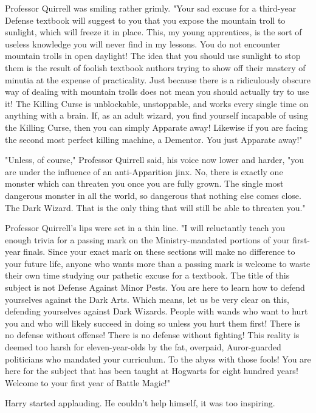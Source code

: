 Professor Quirrell was smiling rather grimly. "Your sad excuse for a third-year
Defense textbook will suggest to you that you expose the mountain troll to
sunlight, which will freeze it in place. This, my young apprentices, is the
sort of useless knowledge you will never find in my lessons. You do not
encounter mountain trolls in open daylight! The idea that you should use
sunlight to stop them is the result of foolish textbook authors trying to show
off their mastery of minutia at the expense of practicality. Just because there
is a ridiculously obscure way of dealing with mountain trolls does not mean you
should actually try to use it! The Killing Curse is unblockable, unstoppable,
and works every single time on anything with a brain. If, as an adult wizard,
you find yourself incapable of using the Killing Curse, then you can simply
Apparate away! Likewise if you are facing the second most perfect killing
machine, a Dementor. You just Apparate away!"

"Unless, of course," Professor Quirrell said, his voice now lower and harder,
"you are under the influence of an anti-Apparition jinx. No, there is exactly
one monster which can threaten you once you are fully grown. The single most
dangerous monster in all the world, so dangerous that nothing else comes close.
The Dark Wizard. That is the only thing that will still be able to threaten
you."

Professor Quirrell's lips were set in a thin line. "I will reluctantly teach
you enough trivia for a passing mark on the Ministry-mandated portions of your
first-year finals. Since your exact mark on these sections will make no
difference to your future life, anyone who wants more than a passing mark is
welcome to waste their own time studying our pathetic excuse for a textbook.
The title of this subject is not Defense Against Minor Pests. You are here to
learn how to defend yourselves against the Dark Arts. Which means, let us be
very clear on this, defending yourselves against Dark Wizards. People with
wands who want to hurt you and who will likely succeed in doing so unless you
hurt them first! There is no defense without offense! There is no defense
without fighting! This reality is deemed too harsh for eleven-year-olds by the
fat, overpaid, Auror-guarded politicians who mandated your curriculum. To the
abyss with those fools! You are here for the subject that has been taught at
Hogwarts for eight hundred years! Welcome to your first year of Battle Magic!"

Harry started applauding. He couldn't help himself, it was too inspiring.

